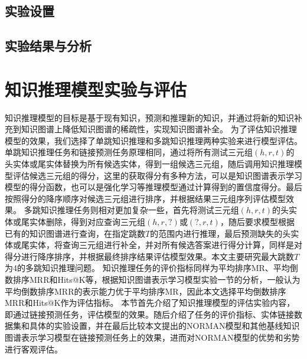 \documentclass[algorithmlist, AutoFakeBold, AutoFakeSlant, figurelist, tablelist, nomlist, masters]{seuthesix}
\begin{document}
\subsection{实验设置}


\subsection{实验结果与分析}


\section{知识推理模型实验与评估}
知识推理模型的目标是基于现有知识，预测和推理新的知识，并通过将新的知识补充到知识图谱上降低知识图谱的稀疏性，实现知识图谱补全。
为了评估知识推理模型的效果，我们选择了单跳知识推理和多跳知识推理两种实验来进行模型评估。
单跳知识推理任务和链接预测任务原理相同，通过将所有测试三元组$\left(h, r, t\right)$的头实体或尾实体替换为所有候选实体，得到一组候选三元组，随后调用知识推理模型评估候选三元组的得分，这里的获取得分有多种方法，可以是知识图谱表示学习模型的得分函数，也可以是强化学习等推理模型通过计算得到的置信度得分。最后按照得分的降序顺序对候选三元组进行排序，并根据结果三元组序列评估模型效果。
多跳知识推理任务则相对更加复杂一些，首先将测试三元组$\left(h, r, t\right)$的头实体或尾实体删除，得到对应查询三元组$\left(h, r, ?\right)$或$\left(?, r, t\right)$，随后要求模型根据已有的知识图谱进行查询，在指定跳数$T$的范围内进行推理，最后预测缺失的头实体或尾实体，将查询三元组进行补全，并对所有候选答案进行得分计算，同样是对得分进行降序排序，并根据最终排序结果评估模型效果。本文主要研究最大跳数$T$为4的多跳知识推理问题。
知识推理任务的评价指标同样为平均排序MR、平均倒数排序MRR和Hits@K等，根据知识图谱表示学习模型实验一节的分析，一般认为平均倒数排序MRR的表示能力优于平均排序MR，因此本文选择平均倒数排序MRR和Hits@K作为评估指标。
本节首先介绍了知识推理模型的评估实验内容，即通过链接预测任务，评估模型的效果。随后介绍了任务的评价指标、实体链接数据集和具体的实验设置，并在最后比较本文提出的NORMAN模型和其他基线知识图谱表示学习模型在链接预测任务上的效果，进而对NORMAN模型的优势和劣势进行客观评估。
\end{document}
